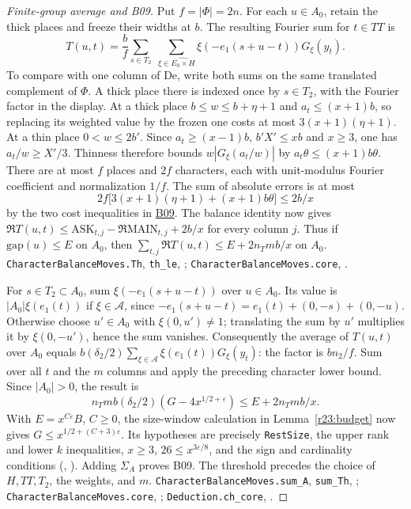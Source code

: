 \begin{proof}[Finite-group average and B09]
Put $f=|\Phi|=2n$. For each $u\in A_0$, retain the thick places and freeze
their widths at $b$. The resulting Fourier sum for $t\in TT$ is
\[
 T(u,t)=\frac{b}{f}\sum_{s\in T_2}\;
        \sum_{\xi\in\widehat{E_0\times H}} \xi(-e_1(s+u-t))G_\xi(y_t).
\]
To compare with one column of $\mathrm{De}$, write both sums on the
same translated complement of $\Phi$. A thick place there is indexed
once by $s\in T_2$, with the Fourier factor in the display. At a thick
place $b\le w\le b+\eta+1$ and $a_t\le(x+1)b$, so replacing its
weighted value by the frozen one costs at most $3(x+1)(\eta+1)$.
At a thin place $0<w\le2b'$. Since $a_t\ge(x-1)b$,
$b'X'\le xb$ and $x\ge3$, one has $a_t/w\ge X'/3$.
Thinness therefore bounds $w|G_\xi(a_t/w)|$ by $a_t\theta\le
(x+1)b\theta$. There are at most $f$ places and $2f$ characters,
each with unit-modulus Fourier coefficient and normalization $1/f$.
The sum of absolute errors is at most
\[
 2f\big[3(x+1)(\eta+1)+(x+1)b\theta\big]\le 2b/x
\]
by the two cost inequalities in \hyperref[sub:B09]{B09}.
The balance identity now gives
$\Re T(u,t)\le\mathrm{ASK}_{t,j}-\Re\mathrm{MAIN}_{t,j}+2b/x$
for every column $j$. Thus if $\mathrm{gap}(u)\le E$ on $A_0$, then
$\sum_{t,j}\Re T(u,t)\le E+2n_Tmb/x$ on $A_0$.
\nolinkurl{CharacterBalanceMoves.Th}, \nolinkurl{th_le},
;
\nolinkurl{CharacterBalanceMoves.core}, .

For $s\in T_2\subset A_0$, sum $\xi(-e_1(s+u-t))$ over $u\in A_0$.
Its value is $|A_0|\xi(e_1(t))$ if $\xi\in\mathcal A$, since
$-e_1(s+u-t)=e_1(t)+(0,-s)+(0,-u)$.
Otherwise choose $u'\in A_0$ with $\xi(0,u')\ne1$; translating the
sum by $u'$ multiplies it by $\xi(0,-u')$, hence the sum vanishes.
Consequently the average of $T(u,t)$ over $A_0$ equals
$b(\delta_2/2)\sum_{\xi\in\mathcal A}\xi(e_1(t))G_\xi(y_t)$:
the factor is $bn_2/f$. Sum over all $t$ and the $m$ columns and apply
the preceding character lower bound. Since $|A_0|>0$, the result is
\[
    n_T m b(\delta_2/2)(G-4x^{1/2+\varepsilon})\le E+2n_Tmb/x .
\]
With $E=x^{C\varepsilon}B$, $C\ge0$, the size-window calculation
in Lemma~\ref{r23:budget} now gives $G\le x^{1/2+(C+3)\varepsilon}$.
Its hypotheses are precisely \nolinkurl{RestSize}, the upper rank and
lower $k$ inequalities, $x\ge3$, $26\le x^{3\varepsilon/8}$, and the
sign and cardinality conditions (, ).
Adding $\Sigma_A$ proves B09. The threshold precedes the choice of
$H,TT,T_2$, the weights, and $m$.
\nolinkurl{CharacterBalanceMoves.sum_A}, \nolinkurl{sum_Th},
;
\nolinkurl{CharacterBalanceMoves.core}, ;
\nolinkurl{Deduction.ch_core}, .
\end{proof}

